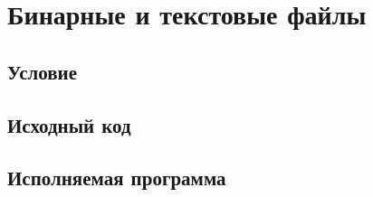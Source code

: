 \documentclass[12pt, a4paper]{article}
\begin{document}
\section{Бинарные и текстовые файлы}
    \subsection{Условие}
        

    \newpage
    \subsection{Исходный код}
        

    \newpage
    \subsection{Исполняемая программа}
        

    \labconclusion{}
\end{document}

